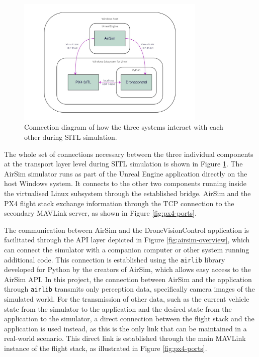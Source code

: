 \begin{figure}
  \centering
  \includegraphics[width=0.8\textwidth,keepaspectratio]{img/sitl-connections.jpg}
  \caption{Connection diagram of how the three systems interact with each other during SITL simulation.}
  \label{fig:sitl-connections}
\end{figure}

The whole set of connections necessary between the three individual components at the transport layer level during SITL simulation is shown in Figure \ref{fig:sitl-connections}.
The AirSim simulator runs as part of the Unreal Engine application directly on the host Windows system. It connects to the other two components running inside the virtualised Linux subsystem through the established bridge. AirSim and the PX4 flight stack exchange information through the TCP connection to the secondary MAVLink server, as shown in Figure \ref{fig:px4-ports}.

The communication between AirSim and the DroneVisionControl application is facilitated through the API layer depicted in Figure \ref{fig:airsim-overview}, which can connect the simulator with a companion computer or other system running additional code. This connection is established using the \texttt{airlib} library developed for Python by the creators of AirSim, which allows easy access to the AirSim API. In this project, the connection between AirSim and the application through \texttt{airlib} transmits only perception data, specifically camera images of the simulated world. 
For the transmission of other data, such as the current vehicle state from the simulator to the application and the desired state from the application to the simulator, a direct connection between the flight stack and the application is used instead, as this is the only link that can be maintained in a real-world scenario. This direct link is established through the main MAVLink instance of the flight stack, as illustrated in Figure \ref{fig:px4-ports}.

